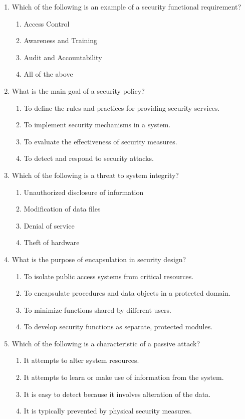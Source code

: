 \documentclass{article}
\begin{document}
\begin{enumerate}
    \item Which of the following is an example of a security functional requirement?
    \begin{enumerate}
        \item Access Control
        \item Awareness and Training
        \item Audit and Accountability
        \item All of the above
    \end{enumerate}
    
    \item What is the main goal of a security policy?
    \begin{enumerate}
        \item To define the rules and practices for providing security services.
        \item To implement security mechanisms in a system.
        \item To evaluate the effectiveness of security measures.
        \item To detect and respond to security attacks.
    \end{enumerate}
    
    \item Which of the following is a threat to system integrity?
    \begin{enumerate}
        \item Unauthorized disclosure of information
        \item Modification of data files
        \item Denial of service
        \item Theft of hardware
    \end{enumerate}
    
    \item What is the purpose of encapsulation in security design?
    \begin{enumerate}
        \item To isolate public access systems from critical resources.
        \item To encapsulate procedures and data objects in a protected domain.
        \item To minimize functions shared by different users.
        \item To develop security functions as separate, protected modules.
    \end{enumerate}
    
    \item Which of the following is a characteristic of a passive attack?
    \begin{enumerate}
        \item It attempts to alter system resources.
        \item It attempts to learn or make use of information from the system.
        \item It is easy to detect because it involves alteration of the data.
        \item It is typically prevented by physical security measures.
    \end{enumerate}
    

\end{enumerate}
\end{document}
